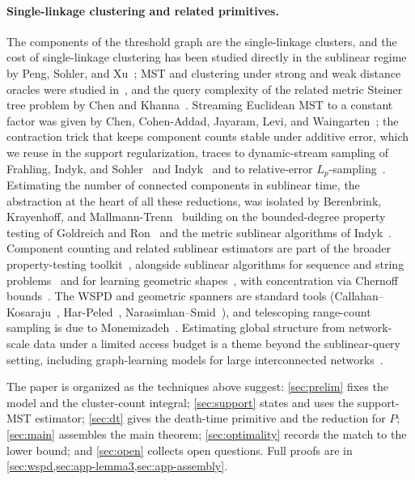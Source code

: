 \paragraph{Single-linkage clustering and related primitives.}
The components of the threshold graph are the single-linkage clusters, and the cost of single-linkage
clustering has been studied directly in the sublinear regime by Peng, Sohler, and
Xu~\cite{PSX25}; MST and clustering under strong and weak distance oracles were studied
in~\cite{MetricOracleMST23}, and the query complexity of the related metric Steiner tree problem by Chen
and Khanna~\cite{ChenKhanna23Steiner}. Streaming Euclidean MST to a constant factor was given by Chen, Cohen-Addad,
Jayaram, Levi, and Waingarten~\cite{ChenCAJLW23}; the contraction trick that keeps component counts
stable under additive error, which we reuse in the support regularization, traces to dynamic-stream sampling
of Frahling, Indyk, and Sohler~\cite{FrahlingIndykSohler05} and Indyk~\cite{Indyk04} and to
relative-error $L_p$-sampling~\cite{MonemizadehWoodruff10}. Estimating the number of connected components in sublinear time, the
abstraction at the heart of all these reductions, was isolated by Berenbrink, Krayenhoff, and
Mallmann-Trenn~\cite{BKM14} building on the bounded-degree property testing of Goldreich and
Ron~\cite{GoldreichRon02} and the metric sublinear algorithms of Indyk~\cite{Indyk99}. Component counting
and related sublinear estimators are part of the broader property-testing toolkit~\cite{CzumajSohler01,
CzumajSohler10,EdenRonSeshadhri18,OnakEtal12,RubinfeldShapira11,BehnezhadRoghaniRubinstein23,CormodeEtal17},
alongside sublinear algorithms for sequence and string problems~\cite{GoldenbergKrauthgamerSaha19,
KociumakaSaha20,MitzenmacherSeddighin21} and for learning geometric
shapes~\cite{HarPeledJonesRahul21}, with concentration via Chernoff bounds~\cite{Chernoff52}. The WSPD and geometric spanners are standard tools
(Callahan--Kosaraju~\cite{CK95}, Har-Peled~\cite{HarPeled11}, Narasimhan--Smid~\cite{NarasimhanSmid07}),
and telescoping range-count sampling is due to Monemizadeh~\cite{Monemizadeh23}. Estimating global structure
from network-scale data under a limited access budget is a theme beyond the sublinear-query setting,
including graph-learning models for large interconnected networks~\cite{Shen26CBAM}.

The paper is organized as the techniques above suggest: \cref{sec:prelim} fixes the model and the
cluster-count integral; \cref{sec:support} states and uses the support-MST estimator; \cref{sec:dt}
gives the death-time primitive and the reduction for $P$; \cref{sec:main} assembles the main theorem;
\cref{sec:optimality} records the match to the lower bound; and \cref{sec:open} collects open questions.
Full proofs are in \cref{sec:wspd,sec:app-lemma3,sec:app-assembly}.

